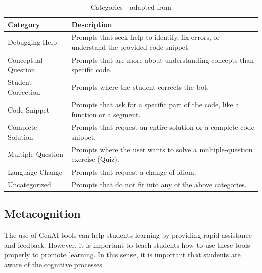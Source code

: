 \documentclass[a4paper,twoside]{article}
\begin{document}


\begin{table}[htbp]
  \caption{Categories - adapted from \cite{Ghimire24}}
  \begin{center}
    \renewcommand{\arraystretch}{1.5} %
    \begin{tabular}{|p{}|p{11cm}|}
      \hline
      \textbf{Category} & \textbf{Description} \\
      \hline
      Debugging Help & Prompts that seek help to identify, fix errors, or understand the provided code snippet. \\
      Conceptual Question & Prompts that are more about understanding concepts than specific code. \\
      Student Correction & Prompts where the student corrects the bot. \\
      \hline
      Code Snippet & Prompts that ask for a specific part of the code, like a function or a segment. \\
      Complete Solution & Prompts that request an entire solution or a complete code snippet. \\
      Multiple Question & Prompts where the user wants to solve a multiple-question exercise (Quiz). \\
      \hline
      Language Change & Prompts that request a change of idiom. \\
      Uncategorized & Prompts that do not fit into any of the above categories. \\
      \hline
    \end{tabular}
    \label{tab:categories}
  \end{center}
\end{table}

\subsection{Metacognition}

The use of GenAI tools can help students learning by providing rapid assistance
and feedback. However, it is important to teach students how to use these tools
properly to promote learning. In this sense, it is important that students are
aware of the cognitive processes.
\end{document}
